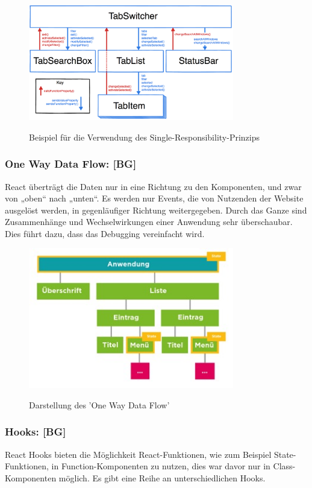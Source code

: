 \begin{figure}[H]
  \centering
  \includegraphics[width=0.8\textwidth]{pics/SRP.png}
  \caption{Beispiel für die Verwendung des Single-Responsibility-Prinzips}
  \cite{SRP}
\end{figure}

\newpage

\subsubsection{One Way Data Flow: [BG]}
React überträgt die Daten nur in eine Richtung zu den Komponenten, und zwar von „oben“ nach „unten“. Es werden nur Events, die von Nutzenden der Website ausgelöst werden, in gegenläufiger Richtung weitergegeben. Durch das Ganze sind Zusammenhänge und Wechselwirkungen einer Anwendung sehr überschaubar. Dies führt dazu, dass das Debugging vereinfacht wird.
\cite{owdf}

\begin{figure}[H]
  \centering
  \includegraphics[width=0.8\textwidth]{pics/owdf.jpg}
  \caption{Darstellung des 'One Way Data Flow'}
  \cite{owdf}
\end{figure}

\subsubsection{Hooks: [BG]}
React Hooks bieten die Möglichkeit React-Funktionen, wie zum Beispiel State-Funktionen, in Function-Komponenten zu nutzen, dies war davor nur in Class- Komponenten möglich. Es gibt eine Reihe an unterschiedlichen Hooks.

